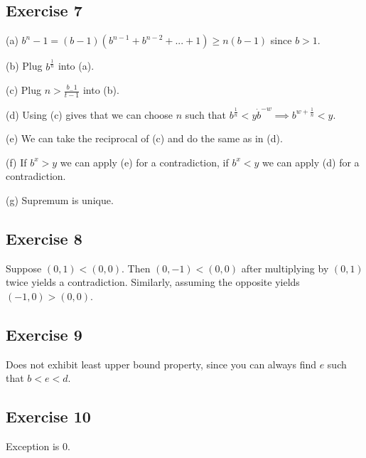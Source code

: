 \subsection{Exercise 7}
(a) $b^n - 1 = (b - 1) (b^{n-1} + b^{n-2} + ... + 1) \geq n (b-1)$ since $b > 1$.

(b) Plug $b^{\frac{1}{n}}$ into (a).

(c) Plug $n > \frac{b_-1}{t-1}$ into (b).

(d) Using (c) gives that we can choose $n$ such that
$b^{\frac{1}{n}} < y \dot b^{-w} \implies b^{w + \frac{1}{n}} < y$.

(e) We can take the reciprocal of (c) and do the same as in (d).

(f) If $b^x > y$ we can apply (e) for a contradiction, if $b^x < y$ we can apply (d)
for a contradiction. 

(g) Supremum is unique.

\subsection{Exercise 8}
Suppose $(0, 1) < (0, 0)$. Then $(0, -1) < (0, 0)$ after multiplying by  $(0, 1)$ twice yields a
contradiction. Similarly, assuming the opposite yields $(-1, 0) > (0, 0)$.

\subsection{Exercise 9}
Does not exhibit least upper bound property, since you can always find $e$ such that $b < e < d$.

\subsection{Exercise 10}
Exception is 0.
